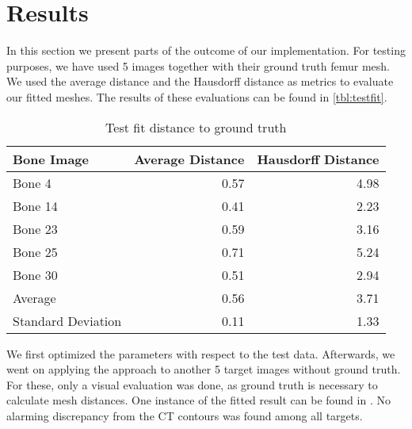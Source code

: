\section{Results}
\label{sec:results}

In this section we present parts of the outcome of our implementation.
For testing purposes, we have used 5 images together with their ground truth femur mesh.
We used the average distance and the Hausdorff distance as metrics to evaluate our fitted meshes.
The results of these evaluations can be found in \autoref{tbl:testfit}.

\begin{table}
  \centering
  \caption{Test fit distance to ground truth}
  \label{tbl:testfit}
  \begin{tabular}{lrr}
    \toprule
      \textbf{Bone Image} &
      Average Distance &
       Hausdorff Distance \\
    \midrule
      Bone 4 & 0.57 & 4.98 \\
      Bone 14 & 0.41 & 2.23 \\
      Bone 23 & 0.59 & 3.16 \\
      Bone 25 & 0.71 & 5.24 \\
      Bone 30 & 0.51 & 2.94 \\
    \midrule
      Average & 0.56 & 3.71 \\
      Standard Deviation & 0.11 & 1.33 \\
    \bottomrule
  \end{tabular}
\end{table}

We first optimized the parameters with respect to the test data.
Afterwards, we went on applying the approach to another 5 target images without ground truth.
For these, only a visual evaluation was done, as ground truth is necessary to calculate mesh distances.
One instance of the fitted result can be found in .
No alarming discrepancy from the CT contours was found among all targets.
